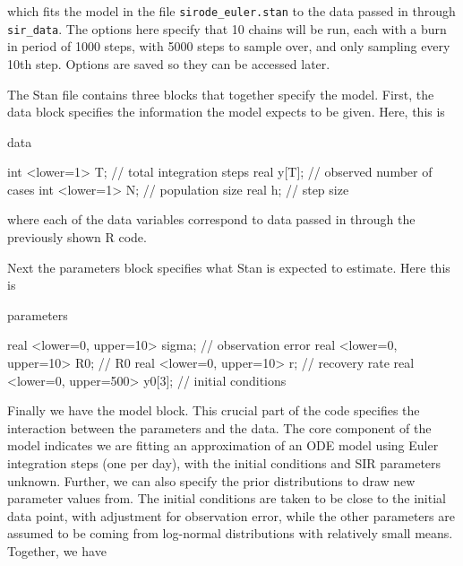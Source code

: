 \documentclass[12pt]{article}
\begin{document}
    which fits the model in the file \verb|sirode_euler.stan| to the data passed in through \verb|sir_data|. The options here specify that 10 chains will be run, each with a burn in period of 1000 steps, with 5000 steps to sample over, and only sampling every 10th step. Options are saved so they can be accessed later.

    The Stan file contains three blocks that together specify the model. First, the data block specifies the information the model expects to be given. Here, this is

    \begin{Stan}
    data {

        int     <lower=1>   T;      // total integration steps
        real                y[T];   // observed number of cases
        int     <lower=1>   N;      // population size
        real                h;      // step size

    }
    \end{Stan}

    where each of the data variables correspond to data passed in through the previously shown R code.

    Next the parameters block specifies what Stan is expected to estimate. Here this is

    \begin{Stan}
    parameters {

        real <lower=0, upper=10>    sigma;  // observation error
        real <lower=0, upper=10>    R0;     // R0
        real <lower=0, upper=10>    r;      // recovery rate
        real <lower=0, upper=500>   y0[3];  // initial conditions

    }
    \end{Stan}

    Finally we have the model block. This crucial part of the code specifies the interaction between the parameters and the data. The core component of the model indicates we are fitting an approximation of an ODE model using Euler integration steps (one per day), with the initial conditions and SIR parameters unknown. Further, we can also specify the prior distributions to draw new parameter values from. The initial conditions are taken to be close to the initial data point, with adjustment for observation error, while the other parameters are assumed to be coming from log-normal distributions with relatively small means. Together, we have
\end{document}
